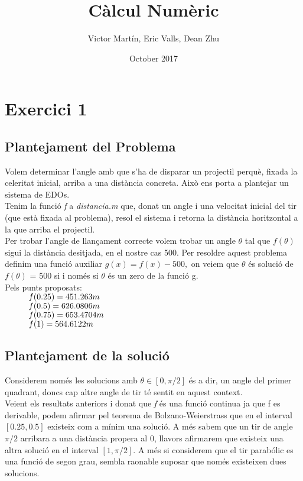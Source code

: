 \documentclass{article}
\title{C\`alcul Num\`eric}
\author{Victor Mart\'in, Eric Valls, Dean Zhu}
\date{October 2017}
\begin{document}
\maketitle
\section*{Exercici 1}
\subsection*{Plantejament del Problema}
\quad Volem determinar l'angle amb que s'ha de disparar un projectil perquè, fixada la celeritat inicial, arriba a una dist\`ancia concreta. Aix\`o ens porta a plantejar un sistema de EDOs. \\

Tenim la funci\'o \emph{f} a \emph{distancia.m}
que, donat un angle i una velocitat inicial del tir (que està fixada al problema), resol el sistema i retorna la dist\`ancia horitzontal a la que arriba el projectil. \\

Per trobar l'angle de llan\c{c}ament correcte volem trobar un angle ${\theta}$ tal que $f({\theta})$ sigui la dist\`ancia desitjada, en el nostre cas 500. Per resoldre aquest problema definim una funci\'o auxiliar $g(x) = f(x) - 500,$ on veiem que ${\theta}$ \'es soluci\'o de $f({\theta})$ = 500 si i només si  ${\theta}$  és un zero de la funci\'o g.\\

Pels punts proposats:\\
$\hspace*{1cm} f(0.25) = 451.263 m$\\
$\hspace*{1cm} f(0.5) = 626.0806 m$\\
$\hspace*{1cm} f(0.75) = 653.4704 m$\\
$\hspace*{1cm} f(1) = 564.6122 m$
\subsection*{Plantejament de la soluci\'o}
\quad Considerem nom\'es les solucions amb $\theta  \in [0,\pi/2]$ \'es a dir, un angle del primer quadrant, doncs cap altre angle de tir t\'e sentit en aquest context.\\

Veient els resultats anteriors i donat que \emph{f} \'es una funci\'o continua ja que f es derivable, podem afirmar pel teorema de Bolzano-Weierstrass que en el interval $[0.25,0.5]$ existeix com a m\'inim una soluci\'o.
A m\'es sabem que un tir de angle $\pi/2$ arribara a una dist\`ancia propera al 0, llavors afirmarem que existeix una altra soluci\'o en el interval $[1,\pi/2]$. A m\'es si considerem que el tir parab\'olic es una funci\'o de segon grau, sembla raonable suposar que nom\'es existeixen dues solucions.
\end{document}
